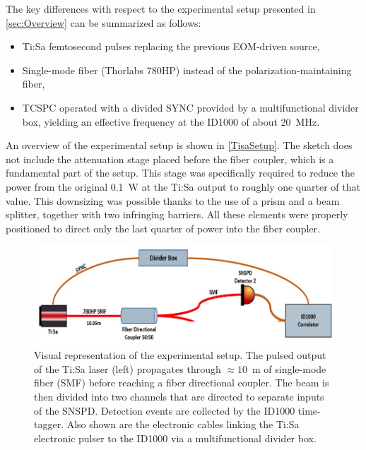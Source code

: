 The key differences with respect to the experimental setup presented in \autoref{sec:Overview} can be summarized as follows:
\begin{itemize}
    \item Ti:Sa femtosecond pulses replacing the previous EOM-driven source,
    \item Single-mode fiber (Thorlabs 780HP) instead of the polarization-maintaining fiber,
    \item TCSPC operated with a divided SYNC provided by a multifunctional divider box, yielding an effective frequency at the ID1000 of about 20~MHz.
\end{itemize}

An overview of the experimental setup is shown in \autoref{TisaSetup}. The sketch does not include the attenuation stage placed before the fiber coupler, which is a fundamental part of the setup. This stage was specifically required to reduce the power from the original 0.1~W at the Ti:Sa output to roughly one quarter of that value. This downsizing was possible thanks to the use of a prism and a beam splitter, together with two infringing barriers. All these elements were properly positioned to direct only the last quarter of power into the fiber coupler.


\begin{figure}[hbtp]
\centering
\includegraphics[width=1\textwidth]{TiSa_Setup.jpg}
\caption{Visual representation of the experimental setup. The pulsed output of the Ti:Sa laser (left) propagates through $\approx 10$~m of single-mode fiber (SMF) before reaching a fiber directional coupler. The beam is then divided into two channels that are directed to separate inputs of the SNSPD. Detection events are collected by the ID1000 time-tagger. Also shown are the electronic cables linking the Ti:Sa electronic pulser to the ID1000 via a multifunctional divider box.}
\label{TisaSetup}
\end{figure}




